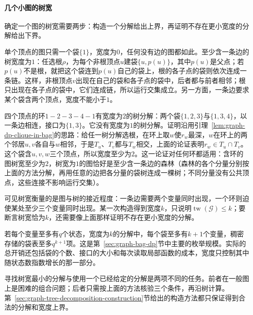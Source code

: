 \paragraph{几个小图的树宽}
确定一个图的树宽需要两步：构造一个分解给出上界，再证明不存在更小宽度的分解给出下界。

单个顶点的图只需一个袋$\{1\}$，宽度为$0$，任何没有边的图都如此。至少含一条边的树宽度为$1$：任选根$\rho$，为每个非根顶点$u$建袋$\{u,p(u)\}$，其中$p(u)$是父点；若$p(u)$不是根，就把这个袋连到$p(u)$自己的袋上，根的各子点的袋则依次连成一条链。这样，非根顶点$v$出现在自己的袋和各子点的袋中，后者都与前者相邻；根只出现在各子点的袋中，它们连成链，所以运行交集成立。另一方面，一条边要求某个袋含两个顶点，宽度不能小于$1$。

四个顶点的环$1-2-3-4-1$有宽度为$2$的树分解：两个袋$\{1,2,3\}$与$\{1,3,4\}$，以一条边相连，接口为$\{1,3\}$。它没有宽度为$1$的树分解。证明沿用引理~\ref{lem:graph-dp-clique-in-bag}的思路：给任一树分解选根，在环上取$w$使$r_w$最深，$w$在环上的两个邻居$u,v$各自与$w$相邻，于是$T_u$、$T_v$都与$T_w$相交，上面的论证表明$r_w\in T_u\cap T_v$。这个袋含$u,v,w$三个顶点，所以宽度至少为$2$。这一论证对任何环都适用：含环的图树宽至少为$2$，树宽为$1$的图恰好是至少含一条边的森林（森林的各个分量分别按上面的方法分解，再用任意的边把各分量的袋树连成一棵树；不同分量没有公共顶点，这些连接不影响运行交集）。

可见树宽衡量的是图与树的接近程度：一条边需要两个变量同时出现，一个环则迫使某处至少三个变量同时出现。某一次构造得到宽度$k$，只说明$\operatorname{tw}(\mathcal G)\leq k$；要断言树宽恰为$k$，还需要像上面那样证明不存在更小宽度的分解。

若每个变量至多有$q$个状态，宽度为$k$的分解中，每个袋至多有$k+1$个变量，稠密存储的袋表至多$q^{k+1}$项。这是第~\ref{sec:graph-bag-dp}节中主要的枚举规模。实际的总开销还包括袋的个数、接口的大小和每次读取局部函数的成本，宽度只控制其中随状态数指数增长的那一部分。

寻找树宽最小的分解与使用一个已经给定的分解是两项不同的任务。前者在一般图上是困难的组合问题；后者只需按上面的方法核验三个条件，再沿树计算。第~\ref{sec:graph-tree-decomposition-construction}节给出的构造方法都只保证得到合法的分解和宽度上界。
